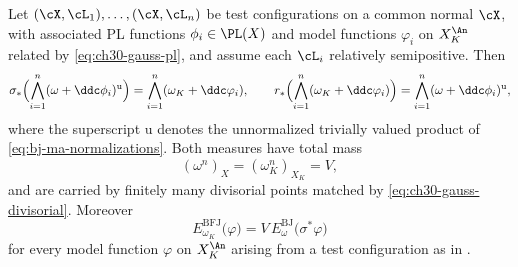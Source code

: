 \begin{theorem}
\label{thm:ch30-gauss-measures}
Let \((\cX,\cL_1),\ldots,(\cX,\cL_n)\) be test configurations on a common
normal \(\cX\), with associated PL functions \(\phi_i\in\PL(X)\) and model
functions \(\varphi_i\) on \(X_K^{\An}\) related by
\eqref{eq:ch30-gauss-pl}, and assume each \(\cL_i\) relatively
semipositive.  Then
\begin{equation}
\label{eq:ch30-gauss-measure-transfer}
 \sigma_*\Bigl(\bigwedge_{i=1}^n(\omega+\ddc\phi_i)^{\mathrm u}\Bigr)
 =\bigwedge_{i=1}^n(\omega_K+\ddc\varphi_i),
 \qquad
 r_*\Bigl(\bigwedge_{i=1}^n(\omega_K+\ddc\varphi_i)\Bigr)
 =\bigwedge_{i=1}^n(\omega+\ddc\phi_i)^{\mathrm u},
\end{equation}
where the superscript \(\mathrm u\) denotes the unnormalized trivially
valued product of \eqref{eq:bj-ma-normalizations}.  Both measures have total
mass
\begin{equation}
\label{eq:ch30-gauss-mass}
 (\omega^n)_X=(\omega_K^n)_{X_K}=V,
\end{equation}
and are carried by finitely many divisorial points matched by
\eqref{eq:ch30-gauss-divisorial}.  Moreover
\begin{equation}
\label{eq:ch30-gauss-energy}
 E^{\mathrm{BFJ}}_{\omega_K}\bigl(\varphi\bigr)
 =V\,E^{\mathrm{BJ}}_{\omega}\bigl(\sigma^*\varphi\bigr)
\end{equation}
for every model function \(\varphi\) on \(X_K^{\An}\) arising from a test
configuration as in .
\end{theorem}


